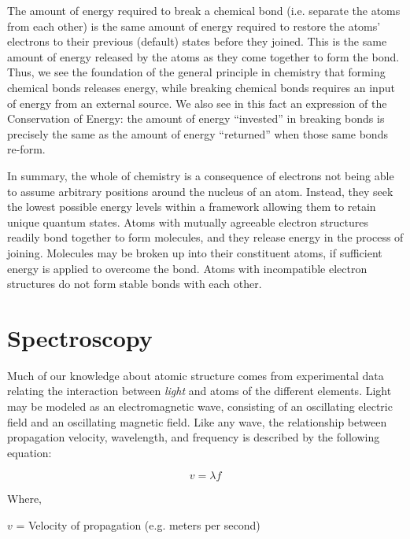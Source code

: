 The amount of energy required to break a chemical bond (i.e. separate the atoms from each other) is the same amount of energy required to restore the atoms' electrons to their previous (default) states before they joined.  This is the same amount of energy released by the atoms as they come together to form the bond.  Thus, we see the foundation of the general principle in chemistry that forming chemical bonds releases energy, while breaking chemical bonds requires an input of energy from an external source.  We also see in this fact an expression of the Conservation of Energy: the amount of energy ``invested'' in breaking bonds is precisely the same as the amount of energy ``returned'' when those same bonds re-form.      

\vskip 10pt

In summary, the whole of chemistry is a consequence of electrons not being able to assume arbitrary positions around the nucleus of an atom.  Instead, they seek the lowest possible energy levels within a framework allowing them to retain unique quantum states.  Atoms with mutually agreeable electron structures readily bond together to form molecules, and they release energy in the process of joining.  Molecules may be broken up into their constituent atoms, if sufficient energy is applied to overcome the bond.  Atoms with incompatible electron structures do not form stable bonds with each other.









\filbreak
\section{Spectroscopy}

Much of our knowledge about atomic structure comes from experimental data relating the interaction between \textit{light} and atoms of the different elements.  Light may be modeled as an electromagnetic wave, consisting of an oscillating electric field and an oscillating magnetic field.  Like any wave, the relationship between propagation velocity, wavelength, and frequency is described by the following equation:

$$v = \lambda f$$

\noindent
Where,

$v$ = Velocity of propagation (e.g. meters per second)

